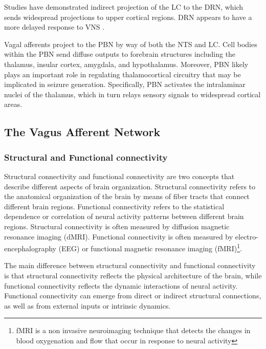   Studies have demonstrated indirect projection of the LC to the DRN, which sends widespread projections to upper cortical regions. DRN appears to have a more delayed response to VNS \cite{HanchemWongIbrahim2018}.

  Vagal afferents project to the PBN by way of both the NTS and LC. Cell bodies within the PBN send diffuse outputs to forebrain structures including the thalamus, insular cortex, amygdala, and hypothalamus. Moreover, PBN likely plays an important role in regulating thalamocortical circuitry that may be implicated in seizure generation. Specifically, PBN activates the intralaminar nuclei of the thalamus, which in turn relays sensory signals to widespread cortical areas. \cite{HanchemWongIbrahim2018}

  \subsection*{The Vagus Afferent Network}
    \subsubsection*{Structural and Functional connectivity}
    Structural connectivity and functional connectivity are two concepts that describe different aspects of brain organization. Structural connectivity refers to the anatomical organization of the brain by means of fiber tracts that connect different brain regions. Functional connectivity refers to the statistical dependence or correlation of neural activity patterns between different brain regions. Structural connectivity is often measured by diffusion magnetic resonance imaging (dMRI). Functional connectivity is often measured by electro-encephalography (EEG) or functional magnetic resonance imaging (fMRI)\footnote{fMRI is a non invasive neuroimaging technique that detects the changes in blood oxygenation and flow that occur in response to neural activity}.

    The main difference between structural connectivity and functional connectivity is that structural connectivity reflects the physical architecture of the brain, while functional connectivity reflects the dynamic interactions of neural activity. Functional connectivity can emerge from direct or indirect structural connections, as well as from external inputs or intrinsic dynamics.

